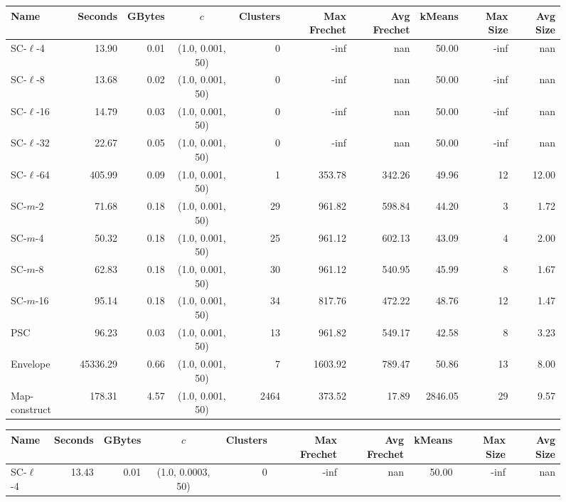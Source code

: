 \begin{figure} \begin{center}
    \begin{minipage}{\textwidth}
    {
    \begin{tabular}{@{}lrrcrrrrrr@{}}
        \toprule
        Name & Seconds & GBytes & $c$ & Clusters & Max Frechet & Avg Frechet & kMeans & Max Size & Avg Size\\
        \midrule
        SC-$\ell$-4 & 13.90 & 0.01 & (1.0, 0.001, 50) & 0 & -inf & nan & 50.00 & -inf & nan\\
        SC-$\ell$-8 & 13.68 & 0.02 & (1.0, 0.001, 50) & 0 & -inf & nan & 50.00 & -inf & nan\\
        SC-$\ell$-16 & 14.79 & 0.03 & (1.0, 0.001, 50) & 0 & -inf & nan & 50.00 & -inf & nan\\
        SC-$\ell$-32 & 22.67 & 0.05 & (1.0, 0.001, 50) & 0 & -inf & nan & 50.00 & -inf & nan\\
        SC-$\ell$-64 & 405.99 & 0.09 & (1.0, 0.001, 50) & 1 & 353.78 & 342.26 & 49.96 & 12 & 12.00\\
        SC-$m$-2 & 71.68 & 0.18 & (1.0, 0.001, 50) & 29 & 961.82 & 598.84 & 44.20 & 3 & 1.72\\
        SC-$m$-4 & 50.32 & 0.18 & (1.0, 0.001, 50) & 25 & 961.12 & 602.13 & 43.09 & 4 & 2.00\\
        SC-$m$-8 & 62.83 & 0.18 & (1.0, 0.001, 50) & 30 & 961.12 & 540.95 & 45.99 & 8 & 1.67\\
        SC-$m$-16 & 95.14 & 0.18 & (1.0, 0.001, 50) & 34 & 817.76 & 472.22 & 48.76 & 12 & 1.47\\
        PSC & 96.23 & 0.03 & (1.0, 0.001, 50) & 13 & 961.82 & 549.17 & 42.58 & 8 & 3.23\\
        Envelope & 45336.29 & 0.66 & (1.0, 0.001, 50) & 7 & 1603.92 & 789.47 & 50.86 & 13 & 8.00\\
        Map-construct & 178.31 & 4.57 & (1.0, 0.001, 50) & 2464 & 373.52 & 17.89 & 2846.05 & 29 & 9.57\\
        \bottomrule
    \end{tabular}
    }
    {
    \begin{tabular}{@{}lrrcrrrrrr@{}}
        \toprule
        Name & Seconds & GBytes & $c$ & Clusters & Max Frechet & Avg Frechet & kMeans & Max Size & Avg Size\\
        \midrule
        SC-$\ell$-4 & 13.43 & 0.01 & (1.0, 0.0003, 50) & 0 & -inf & nan & 50.00 & -inf & nan\\

\end{tabular}}
\end{minipage}
\end{center}
\end{figure}
